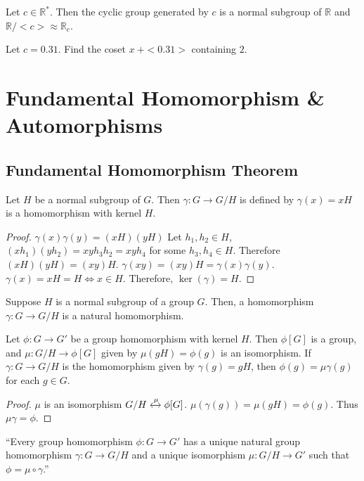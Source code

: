 \begin{remark}
	Let $c \in \mathbb{R}^*$.
	Then the cyclic group generated by $c$ is
	a normal subgroup of $\mathbb{R}$ and $\mathbb{R}/<c> \approx \mathbb{R}_c$.
\end{remark}

\begin{question}
	Let $c = 0.31$.
	Find the coset $x\ +<0.31>$ containing $2$.
\end{question}

\section{Fundamental Homomorphism \& Automorphisms}
\subsection{Fundamental Homomorphism Theorem}
\begin{theorem}
	Let $H$ be a normal subgroup of $G$.
	Then $\gamma : G \to G/H$ is defined by
	$\gamma(x) = xH$  is a homomorphism with kernel $H$.
\end{theorem}
\begin{proof}
	$\gamma(x)\gamma(y) = (xH)(yH)$
	Let $h_1,h_2 \in H$, $(xh_1)(yh_2) = xyh_3h_2 = xyh_4$ for some $h_3,h_4 \in H$.
	Therefore $(xH)(yH) = (xy)H$.
	$\gamma(xy) = (xy)H = \gamma(x)\gamma(y)$.
	$\gamma(x) = xH = H \iff x \in H$.
	Therefore, $\ker(\gamma) = H$.
\end{proof}

\begin{remark}
	Suppose $H$ is a normal subgroup of a group $G$.
	Then, a homomorphism $\gamma : G \to G/H$ is a natural homomorphism.
\end{remark}

\begin{theorem}
	Let $\phi : G \to G'$ be a group homomorphism with kernel $H$.
	Then $\phi[G]$ is a group, and $\mu : G/H \to \phi[G]$ given by $\mu(gH) = \phi(g)$ is an isomorphism.
	If $\gamma : G \to G/H$ is the homomorphism given by $\gamma(g) = gH$, then $\phi(g) = \mu\gamma(g)$ for each $g \in G$.
\end{theorem}
\begin{proof}
	$\mu$ is an isomorphism $G/H \xleftrightarrow{\mu}\phi[G]$.
	$\mu(\gamma(g)) = \mu(gH) = \phi(g)$.
	Thus $\mu\gamma = \phi$.
\end{proof}
\begin{commentary}
	``Every group homomorphism $\phi : G \to G'$ has a unique natural group homomorphism $\gamma : G \to G/H$ and a unique isomorphism $\mu : G/H \to G'$ such that $\phi = \mu \circ \gamma$.''
\end{commentary}

